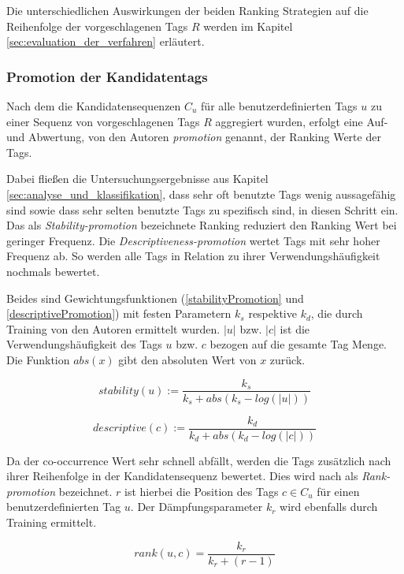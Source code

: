 Die unterschiedlichen Auswirkungen der beiden Ranking Strategien auf die Reihenfolge der vorgeschlagenen Tags $R$ werden im Kapitel \ref{sec:evaluation_der_verfahren} erläutert. 

\subsubsection{Promotion der Kandidatentags} %
\label{ssub:promotion}
Nach dem die Kandidatensequenzen $C_u$ für alle benutzerdefinierten Tags $u$ zu einer Sequenz von vorgeschlagenen Tags $R$ aggregiert wurden, erfolgt eine Auf- und Abwertung, von den Autoren \emph{promotion} genannt, der Ranking Werte der Tags.

Dabei fließen die Untersuchungsergebnisse aus Kapitel \ref{sec:analyse_und_klassifikation}, dass sehr oft benutzte Tags wenig aussagefähig sind sowie dass sehr selten benutzte Tags zu spezifisch sind, in diesen Schritt ein. Das als \emph{Stability-promotion} bezeichnete Ranking reduziert den Ranking Wert bei geringer Frequenz. Die \emph{Descriptiveness-promotion} wertet Tags mit sehr hoher Frequenz ab. So werden alle Tags in Relation zu ihrer Verwendungshäufigkeit nochmals bewertet. 

Beides sind Gewichtungsfunktionen (\ref{stabilityPromotion} und \ref{descriptivePromotion}) mit festen Parametern $k_s$ respektive $k_d$, die durch Training von den Autoren ermittelt wurden. $\vert u \vert$ bzw. $\vert c \vert$ ist die Verwendungshäufigkeit des Tags $u$ bzw. $c$ bezogen auf die gesamte Tag Menge. Die Funktion $abs(x)$ gibt den absoluten Wert von $x$ zurück.
\begin{figure}[hptb]
 \begin{equation}
 \label{stabilityPromotion}
    stability(u) := \frac{k_s}{k_s + abs(k_s - log(\vert u \vert))}
 \end{equation}
\end{figure}

\begin{figure}[hptb]
 \begin{equation}
 \label{descriptivePromotion}
    descriptive(c) := \frac{k_d}{k_d + abs(k_d - log(\vert c \vert))}
 \end{equation}
\end{figure}



Da der co-occurrence Wert sehr schnell abfällt, werden die Tags zusätzlich nach ihrer Reihenfolge in der Kandidatensequenz bewertet. Dies wird nach \cite{collectiveKnowledge} als \emph{Rank-promotion} bezeichnet. $r$ ist hierbei die Position des Tags $c \in C_u$ für einen benutzerdefinierten Tag $u$. Der Dämpfungsparameter $k_r$ wird ebenfalls durch Training ermittelt. 
\begin{figure}[hptb]
 \begin{equation}
 \label{rankPromotion}
    rank(u, c) = \frac{k_r}{k_r + (r-1)}
 \end{equation}
\end{figure}


